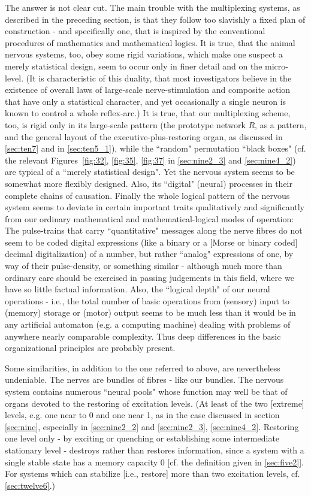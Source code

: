 \documentclass[twocolumn,preprintnumbers,amsmath,amssymb,floatfix]{revtex4}
\begin{document}
The answer is not clear cut. The main trouble with the
multiplexing systems, as described in the preceding section, is
that they follow too slavishly a fixed plan of construction - and
specifically one, that is inspired by the conventional procedures
of mathematics and mathematical logics. It is true, that the
animal nervous systems, too, obey some rigid variations, which
make one suspect a merely statistical design, seem to occur only
in finer detail and on the micro-level. (It is characteristic of
this duality, that most investigators believe in the existence of
overall laws of large-scale nerve-stimulation and composite action
that have only a statistical character, and yet occasionally a
single neuron is known to control a whole reflex-arc.) It is true,
that our multiplexing scheme, too, is rigid only in its
large-scale pattern (the prototype network $R$, as a pattern, and
the general layout of the executive-plus-restoring organ, as
discussed in \ref{sec:ten7} and in \ref{sec:ten5_1}), while the
``random" permutation ``black boxes" (cf. the relevant
Figures~\ref{fig:32}, \ref{fig:35}, \ref{fig:37} in
\ref{sec:nine2_3} and \ref{sec:nine4_2}) are typical of a ``merely
statistical design". Yet the nervous system seems to be somewhat
more flexibly designed. Also, its ``digital" (neural) processes in
their complete chains of causation. Finally the whole logical
pattern of the nervous system seems to deviate in certain
important traits qualitatively and significantly from our ordinary
mathematical and mathematical-logical modes of operation: The
pulse-trains that carry ``quantitative" messages along the nerve
fibres do not seem to be coded digital expressions (like a binary
or a [Morse or binary coded] decimal digitalization) of a number,
but rather ``analog" expressions of one, by way of their
pulse-density, or something similar - although much more than
ordinary care should be exercised in passing judgements in this
field, where we have so little factual information. Also, the
``logical depth" of our neural operations - i.e., the total number
of basic operations from (sensory) input to (memory) storage or
(motor) output seems to be much less than it would be in any
artificial automaton (e.g. a computing machine) dealing with
problems of anywhere nearly comparable complexity. Thus deep
differences in the basic organizational principles are probably
present.

Some similarities, in addition to the one referred to above, are
nevertheless undeniable. The nerves are bundles of fibres - like
our bundles. The nervous system contains numerous ``neural pools"
whose function may well be that of organs devoted to the restoring
of excitation levels. (At least of the two [extreme] levels, e.g.
one near to 0 and one near 1, as in the case discussed in section
\ref{sec:nine}, especially in \ref{sec:nine2_2} and
\ref{sec:nine2_3}, \ref{sec:nine4_2}. Restoring one level only -
by exciting or quenching or establishing some intermediate
stationary level - destroys rather than restores information,
since a system with a single stable state has a memory capacity 0
[cf. the definition given in \ref{sec:five2}]. For systems which
can stabilize [i.e., restore] more than two excitation levels, cf.
\ref{sec:twelve6}.)
\end{document}
